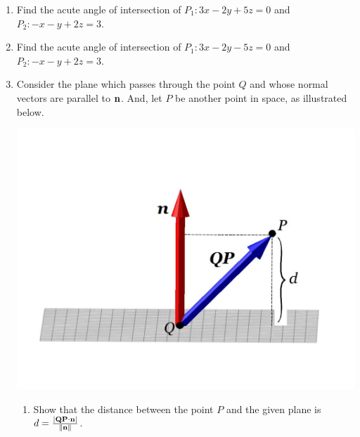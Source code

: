 \documentclass[12pt]{article}
\newif\ifans
\begin{document}
\begin{enumerate}
\begin{enumerate}
\end{enumerate}

\item Find the acute angle of intersection of $P_1: 3x-2y+5z=0$ and $P_2: -x-y+2z=3$.

\ifans{\fbox{$\cos^{-1}\left(\frac{9}{\sqrt{38}\sqrt{6}}\right)$}} \fi

\item Find the acute angle of intersection of $P_1: 3x-2y-5z=0$ and $P_2: -x-y+2z=3$.

\ifans{\fbox{$\pi-\cos^{-1}\left(\frac{-11}{\sqrt{38}\sqrt{6}}\right)$}} \fi

\item Consider the plane which passes through the point $Q$ and whose normal vectors are parallel to ${\bf n}$.  And, let $P$ be another point in space, as illustrated below.

\begin{center}
\includegraphics[scale=0.5]{distance.pdf}
\end{center}

\begin{enumerate}

\item Show that the distance between the point $P$ and the given plane is $d=\frac{|{\bf QP}\cdot{\bf n}|}{\|{\bf n}\|}$.

\ifans{\fbox{$d=\left\|\text{Proj}_{\bf n}{\bf QP}\right\|=\left\|\left(\frac{{\bf QP}\cdot{\bf n}}{\|{\bf n}\|^2}\right){\bf n}\right\| =\frac{|{\bf QP}\cdot{\bf n}|}{\|{\bf n}\|^2}\|{\bf n}\|=\frac{|{\bf QP}\cdot {\bf n}|}{\|{\bf n}\|}$}} \fi


\end{enumerate}
\end{enumerate}
\end{document}
